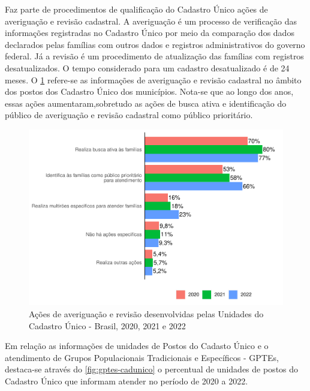 \documentclass[
  brazilian]{report}
\begin{document}
Faz parte de procedimentos de qualificação do Cadastro Único ações de
averiguação e revisão cadastral. A averiguação é um processo de
verificação das informações registradas no Cadastro Único por meio da
comparação dos dados declarados pelas famílias com outros dados e
registros administrativos do governo federal. Já a revisão é um
procedimento de atualização das famílias com registros desatualizados. O
tempo considerado para um cadastro desatualizado é de 24 meses. O
\cref{fig:ave_cad} refere-se as informações de averiguação e revisão
cadastral no âmbito dos postos dos Cadastro Único dos municípios.
Nota-se que ao longo dos anos, essas ações aumentaram,sobretudo as ações
de busca ativa e identificação do público de averiguação e revisão
cadastral como público prioritário.

\begin{figure}
\includegraphics{Censo-SUAS-2022_files/figure-latex/ave_cad-1} \caption[Ações de averiguação e revisão desenvolvidas pelas Unidades do Cadastro Único - Brasil, 2020, 2021 e 2022]{Ações de averiguação e revisão desenvolvidas pelas Unidades do Cadastro Único - Brasil, 2020, 2021 e 2022}\label{fig:ave_cad}
\end{figure}

Em relação as informações de unidades de Postos do Cadasto Único e o
atendimento de Grupos Populacionais Tradicionais e Específicos - GPTEs,
destaca-se através do \cref{fig:gptes-cadunico} o percentual de unidades
de postos do Cadastro Único que informam atender no período de 2020 a
2022.
\end{document}
